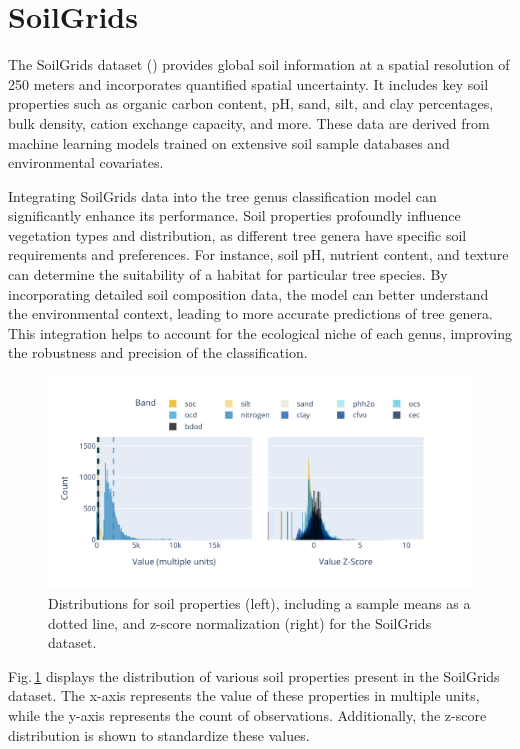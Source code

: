\section{SoilGrids}

The SoilGrids dataset (\cite{soil_report}) provides global soil information at a spatial resolution of 250 meters and incorporates quantified spatial uncertainty. It includes key soil properties such as organic carbon content, pH, sand, silt, and clay percentages, bulk density, cation exchange capacity, and more. These data are derived from machine learning models trained on extensive soil sample databases and environmental covariates.

Integrating SoilGrids data into the tree genus classification model can significantly enhance its performance. Soil properties profoundly influence vegetation types and distribution, as different tree genera have specific soil requirements and preferences. For instance, soil pH, nutrient content, and texture can determine the suitability of a habitat for particular tree species. By incorporating detailed soil composition data, the model can better understand the environmental context, leading to more accurate predictions of tree genera. This integration helps to account for the ecological niche of each genus, improving the robustness and precision of the classification.

\begin{figure}[ht]
    \centering
    \includegraphics[width=0.98\linewidth, trim={15pt 25pt 10pt 20pt}, clip]{figures/figures_features/soil_hist.pdf}
    \caption{Distributions for soil properties (left), including a sample means as a dotted line, and z-score normalization (right) for the SoilGrids dataset.}
    \label{fig:soil_hist}
\end{figure}

Fig.\,\ref{fig:soil_hist} displays the distribution of various soil properties present in the SoilGrids dataset. The x-axis represents the value of these properties in multiple units, while the y-axis represents the count of observations. Additionally, the z-score distribution is shown to standardize these values.

